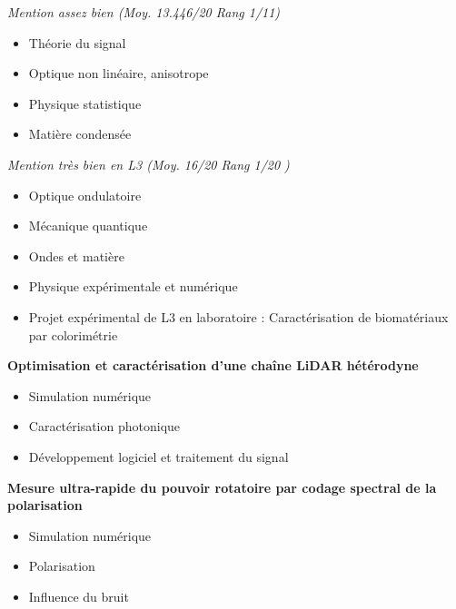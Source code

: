 \documentclass[9pt,a4paper,academicons]{altacv}
\begin{document}
\divider

\textit{Mention assez bien (Moy. 13.446/20 Rang 1/11)}\smallskip
\small{
  \begin{itemize}
    \item Théorie du signal
    \item Optique non linéaire, anisotrope
    \item Physique statistique
    \item Matière condensée
  \end{itemize}
}
\divider

\textit{Mention très bien en L3 (Moy. 16/20 Rang 1/20 )}\smallskip
\small{
  \begin{itemize}
    \item Optique ondulatoire
    \item Mécanique quantique
    \item Ondes et matière
    \item Physique expérimentale et numérique
    \item Projet expérimental de L3 en laboratoire : Caractérisation de biomatériaux par colorimétrie
  \end{itemize}
}




\textbf{Optimisation et caractérisation d'une chaîne LiDAR hétérodyne}
\small{
  \begin{itemize}
    \item Simulation numérique
    \item Caractérisation photonique
    \item Développement logiciel et traitement du signal
  \end{itemize}
}

\divider


\textbf{Mesure ultra-rapide du pouvoir rotatoire par codage spectral de la
  polarisation}
\small{
  \begin{itemize}
    \item Simulation numérique
    \item Polarisation
    \item Influence du bruit
  \end{itemize}
}
\end{document}
